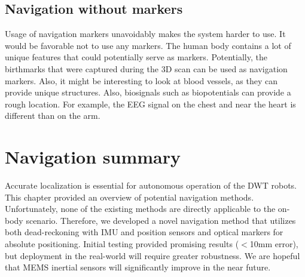 \subsection{Navigation without markers}
Usage of navigation markers unavoidably makes the system harder to use. It would be favorable not to use any markers. The human body contains a lot of unique features that could potentially serve as markers. Potentially, the birthmarks that were captured during the 3D scan can be used as navigation markers. Also, it might be interesting to look at blood vessels, as they can provide unique structures. Also, biosignals such as biopotentials can provide a rough location. For example, the EEG signal on the chest and near the heart is different than on the arm. 

\section{Navigation summary}
Accurate localization is essential for autonomous operation of the DWT robots. This chapter provided an overview of potential navigation methods. Unfortunately, none of the existing methods are directly applicable to the on-body scenario. Therefore, we developed a novel navigation method that utilizes both dead-reckoning with IMU and position sensors and optical markers for absolute positioning. Initial testing provided promising results ($<$10mm error), but deployment in the real-world will require greater robustness. We are hopeful that MEMS inertial sensors will significantly improve in the near future. 
